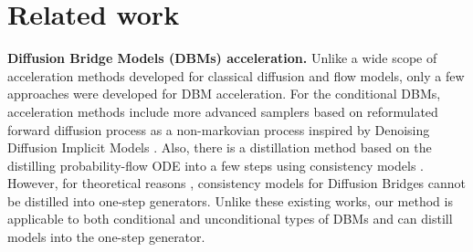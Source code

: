 \section{Related work}
\vspace{-2mm}
\textbf{Diffusion Bridge Models (DBMs) acceleration.} 
Unlike a wide scope of acceleration methods developed for classical diffusion and flow models, only a few approaches were developed for DBM acceleration. 
For the conditional DBMs, acceleration methods include more advanced samplers \citep{zheng2024diffusion, wang2024implicit} based on reformulated forward diffusion process as a non-markovian process inspired by Denoising Diffusion Implicit Models \citep{song2021denoising}. 
Also, there is a distillation method based on the distilling probability-flow ODE into a few steps using consistency models \cite{he2024consistency}. 
However, for theoretical reasons \citep[Section 3.4]{he2024consistency}, consistency models for Diffusion Bridges cannot be distilled into one-step generators. 
Unlike these existing works, our method is applicable to both conditional and unconditional types of DBMs and can distill models into the one-step generator.

